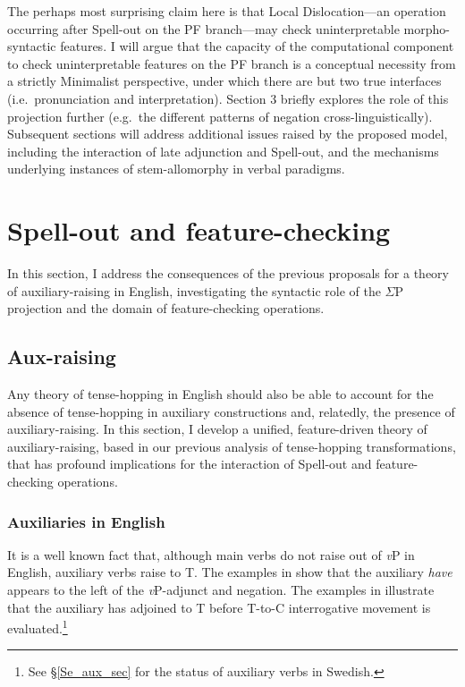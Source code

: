 The perhaps most surprising claim here is that Local Dislocation---an operation occurring after Spell-out on the PF branch---may check uninterpretable morpho-syntactic features. I will argue that the capacity of the computational component to check uninterpretable features on the PF branch is a conceptual necessity from a strictly Minimalist perspective, under which there are but two true interfaces (i.e.\ pronunciation and interpretation).  Section 3 briefly explores the role of this projection further (e.g.\ the different patterns of negation cross-linguistically). Subsequent sections will address additional issues raised by the proposed model, including the interaction of late adjunction and Spell-out, and the mechanisms underlying instances of stem-allomorphy in verbal paradigms.


\section{Spell-out and feature-checking}\label{spellout_feature_check}
In this section, I address the consequences of the previous proposals for a theory of auxiliary-raising in English, investigating the syntactic role of the $\Sigma$P projection and the domain of feature-checking operations.

\subsection{Aux-raising}
Any theory of tense-hopping in English should also be able to account for the absence of tense-hopping in auxiliary constructions and, relatedly, the presence of auxiliary-raising. In this section, I develop a unified, feature-driven theory of auxiliary-raising, based in our previous analysis of tense-hopping transformations, that has profound implications for the interaction of Spell-out and feature-checking operations.

\subsubsection{Auxiliaries in English}
It is a well known fact that, although main verbs do not raise out of {\it v}P in English, auxiliary verbs raise to T. The examples in \Next[a-b] show that the auxiliary {\it have} appears to the left of the {\it v}P-adjunct and negation. The examples in \Next[c-d] illustrate that the auxiliary has adjoined to T before T-to-C interrogative movement is evaluated.\footnote{See \S\ref{Se_aux_sec} for the status of auxiliary verbs in Swedish.}

